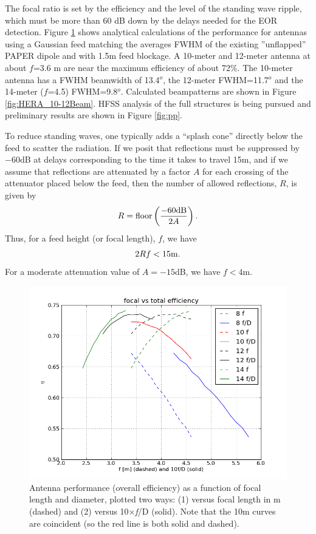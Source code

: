 \documentclass[11pt]{article}
\begin{document}
The focal ratio is set by the efficiency and the level of the standing wave ripple, which must be more than 60 dB down by the delays needed for the EOR detection.  Figure \ref{fig:heraDishfDplot} shows analytical calculations of the performance for antennas using a Gaussian feed matching the averages FWHM of the existing ''unflapped'' PAPER dipole and with 1.5m feed blockage.  A 10-meter and 12-meter antenna at about $f$=3.6 m are near the maximum efficiency of about 72\%.  The 10-meter antenna has a FWHM beamwidth of 13.4$^o$, the 12-meter FWHM=11.7$^o$ and the 14-meter ($f$=4.5) FWHM=9.8$^o$.  Calculated beampatterns are shown in Figure \ref{fig:HERA_10-12Beam}.  HFSS analysis of the full structures is being pursued and preliminary results are shown in Figure \ref{fig:pp}.

To reduce standing waves, one typically adds a ``splash cone'' directly below the feed to scatter the radiation.
If we posit that reflections must be suppressed by $-60$dB at delays corresponding to the time it takes
to travel 15m, and if we assume that reflections are attenuated by a factor $A$ for each crossing of the
attenuator placed below the feed, then the number of allowed reflections, $R$, is given by
\begin{equation}
R={\rm floor}\left(\frac{-60{\rm dB}}{2A}\right).
\end{equation}
Thus, for a feed height (or focal length), $f$, we have
\begin{equation}
2Rf<15{\rm m}.
\end{equation}
For a moderate attenuation value of $A=-15$dB, we have $f<4$m.

\begin{figure}[H]
\centering
\includegraphics[width=\textwidth]{heraDishfDplot.png}
\caption{Antenna performance (overall efficiency) as a function of focal length and diameter, plotted two ways:  (1) versus focal length in m (dashed) and (2) versus 10$\times${\em f}/D (solid).  Note that the 10m curves are coincident (so the red line is both solid and dashed).}
\label{fig:heraDishfDplot}
\end{figure}
\end{document}
